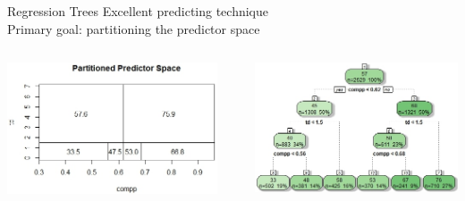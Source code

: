 \documentclass{beamer}
\begin{document}
	\begin{frame}{Regression Trees}
		Excellent predicting technique\\
		Primary goal: partitioning the predictor space\\
		\vspace{20pt}
		\begin{columns}
			\begin{column}[t]{0.5\textwidth}
				\includegraphics[scale=.45]{expartspace.jpeg}
			\end{column}
			\begin{column}{0.08\textwidth}
			\end{column}
			\begin{column}[t]{\dimexpr\paperwidth-20pt}
				\includegraphics[scale=.5]{extree.jpeg}
			\end{column}
		\end{columns}
	\end{frame}
\end{document}
